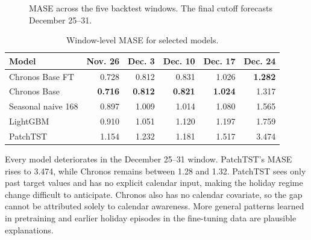 \documentclass[11pt,a4paper]{article}
\newcommand{\best}[1]{\textbf{\color{navy}#1}}
\begin{document}
\begin{figure}[htbp]
\centering
{}
\caption{MASE across the five backtest windows. The final cutoff forecasts December 25--31.}
\label{fig:windowmase}
\end{figure}

\begin{table}[htbp]
\centering
\caption{Window-level MASE for selected models.}
\label{tab:windowmase}
\begin{tabular}{@{}lrrrrr@{}}
\toprule
Model & Nov. 26 & Dec. 3 & Dec. 10 & Dec. 17 & Dec. 24\\
\midrule
Chronos Base FT & 0.728 & 0.812 & 0.831 & 1.026 & \best{1.282}\\
Chronos Base & \best{0.716} & \best{0.812} & \best{0.821} & \best{1.024} & 1.317\\
Seasonal naive 168 & 0.897 & 1.009 & 1.014 & 1.080 & 1.565\\
LightGBM & 0.910 & 1.051 & 1.120 & 1.197 & 1.759\\
PatchTST & 1.154 & 1.232 & 1.181 & 1.517 & 3.474\\
\bottomrule
\end{tabular}
\end{table}

Every model deteriorates in the December 25--31 window. PatchTST's MASE rises to 3.474, while
Chronos remains between 1.28 and 1.32. PatchTST sees only past target values and has no explicit
calendar input, making the holiday regime change difficult to anticipate. Chronos also has no
calendar covariate, so the gap cannot be attributed solely to calendar awareness. More general
patterns learned in pretraining and earlier holiday episodes in the fine-tuning data are plausible
explanations.
\end{document}
